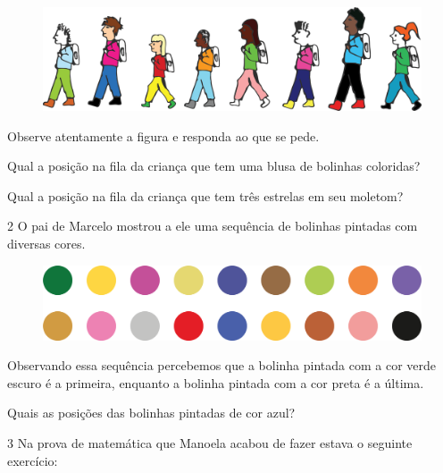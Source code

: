 \begin{figure}[htpb!]
\includegraphics[width=\textwidth]{./media/image27.png}
\end{figure}

Observe atentamente a figura e responda ao que se pede.

\begin{escolha}
\item Qual a posição na fila da criança que tem uma blusa de bolinhas coloridas?

\item Qual a posição na fila da criança que tem três estrelas em seu moletom?
\end{escolha}

\num{2} O pai de Marcelo mostrou a ele uma sequência de bolinhas pintadas com
diversas cores.

\begin{figure}[htpb!]
\includegraphics[width=\textwidth]{./media/image28.png}
\end{figure}

Observando essa sequência percebemos que a bolinha pintada com a cor
verde escuro é a primeira, enquanto a bolinha pintada com a cor preta é a
última.

Quais as posições das bolinhas pintadas de cor azul?


\num{3} Na prova de matemática que Manoela acabou de fazer estava o seguinte exercício:

